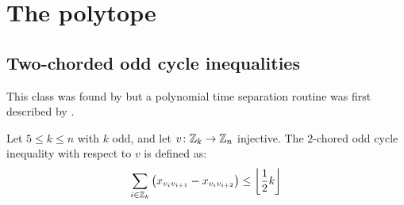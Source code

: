 \section{The \CP polytope}\label{sec:cpp}

\subsection{Two-chorded odd cycle inequalities}
This class was found by \cite{grotschelFacetsCliquePartitioning1990} but a polynomial time separation routine was first described by \cite{mullerPartialOrderPolytope1996}.

\begin{definition}\label{def:2-chords}
	Let $5 \leq k \leq n$ with $k$ odd, and let $v\colon \mathbb{Z}_k \to \mathbb{Z}_n$ injective.
	The $2$-chored odd cycle inequality with respect to $v$ is defined as:
	\begin{equation}\label{eq:2-chords}
		\sum_{i \in \mathbb{Z}_k} \left( x_{v_i v_{i+1}} - x_{v_i v_{i+2}} \right) \leq \left\lfloor \frac{1}{2} k \right\rfloor
	\end{equation}
\end{definition}
